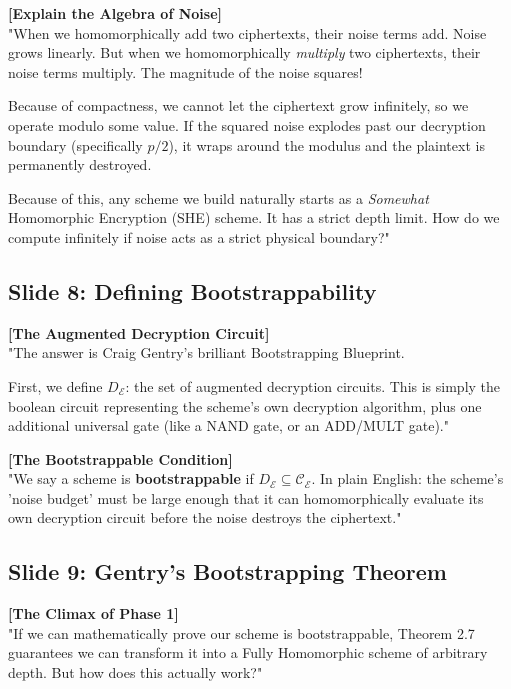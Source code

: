 \documentclass[11pt]{article}
\begin{document}
\textbf{[Explain the Algebra of Noise]} \\
"When we homomorphically add two ciphertexts, their noise terms add. Noise grows linearly. But when we homomorphically \textit{multiply} two ciphertexts, their noise terms multiply. The magnitude of the noise squares! 

Because of compactness, we cannot let the ciphertext grow infinitely, so we operate modulo some value. If the squared noise explodes past our decryption boundary (specifically $p/2$), it wraps around the modulus and the plaintext is permanently destroyed.

Because of this, any scheme we build naturally starts as a \textit{Somewhat} Homomorphic Encryption (SHE) scheme. It has a strict depth limit. How do we compute infinitely if noise acts as a strict physical boundary?"

\subsection*{Slide 8: Defining Bootstrappability}
\textbf{[The Augmented Decryption Circuit]} \\
"The answer is Craig Gentry's brilliant Bootstrapping Blueprint. 

First, we define $D_{\mathcal{E}}$: the set of augmented decryption circuits. This is simply the boolean circuit representing the scheme's own decryption algorithm, plus one additional universal gate (like a NAND gate, or an ADD/MULT gate)."

\textbf{[The Bootstrappable Condition]} \\
"We say a scheme is \textbf{bootstrappable} if $D_{\mathcal{E}} \subseteq \mathcal{C}_{\mathcal{E}}$. In plain English: the scheme's 'noise budget' must be large enough that it can homomorphically evaluate its own decryption circuit before the noise destroys the ciphertext."

\subsection*{Slide 9: Gentry's Bootstrapping Theorem}
\textbf{[The Climax of Phase 1]} \\
"If we can mathematically prove our scheme is bootstrappable, Theorem 2.7 guarantees we can transform it into a Fully Homomorphic scheme of arbitrary depth. But how does this actually work?"
\end{document}
